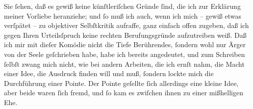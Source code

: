 \pstart
           Sie{ }ſehen, daß es gewiß keine künſtleriſchen Gründe{ }ſind, die ich zur Erklärung
               meiner Vorliebe heranziehe; und{ }ſo muß ich auch, wenn {\pb}ich mich – gewiß etwas verſpätet – zu objektiver Selbſtkritik aufraffe, ganz
               einfach offen zugeben, daß ich gegen Ihren Urteilsſpruch keine rechten
               Berufungsgründe aufzutreiben weiß. Daß ich mir mit dieſer Komödie nicht die Tiefe
               Berührendes,{ }ſondern wohl nur Ärger von der Seele geſchrieben habe, habe ich bereits
               angedeutet, und zum Schreiben{ }ſelbſt zwang mich nicht, wie bei andern Arbeiten, die
               ich ernſt nahm, die Macht einer Idee, die Ausdruck finden will und muß,{ }ſondern
               lockte mich die Durchführung einer Pointe. Der Pointe geſellte{ }ſich allerdings eine
               kleine Idee, aber beide waren{ }ſich fremd, und{ }ſo kam es zwiſchen ihnen zu einer
               mißhelligen Ehe.\pend
           

